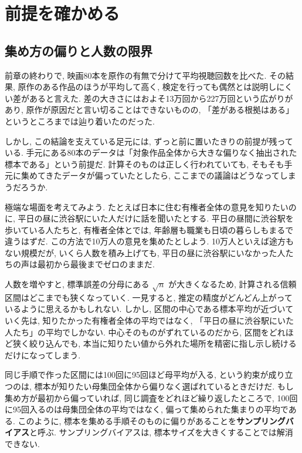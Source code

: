 \section{前提を確かめる}

  \subsection{集め方の偏りと人数の限界}

    前章の終わりで, 映画80本を原作の有無で分けて平均視聴回数を比べた.
    その結果, 原作のある作品のほうが平均して高く, 検定を行っても偶然とは説明しにくい差があると言えた.
    差の大きさにはおよそ13万回から227万回という広がりがあり, 原作が原因だと言い切ることはできないものの, 「差がある根拠はある」というところまでは辿り着いたのだった.

    しかし, この結論を支えている足元には, ずっと前に置いたきりの前提が残っている.
    手元にある80本のデータは「対象作品全体から大きな偏りなく抽出された標本である」という前提だ.
    計算そのものは正しく行われていても, そもそも手元に集めてきたデータが偏っていたとしたら, ここまでの議論はどうなってしまうだろうか.

    極端な場面を考えてみよう.
    たとえば日本に住む有権者全体の意見を知りたいのに, 平日の昼に渋谷駅にいた人だけに話を聞いたとする.
    平日の昼間に渋谷駅を歩いている人たちと, 有権者全体とでは, 年齢層も職業も日頃の暮らしもまるで違うはずだ.
    この方法で10万人の意見を集めたとしよう.
    10万人といえば途方もない規模だが, いくら人数を積み上げても, 平日の昼に渋谷駅にいなかった人たちの声は最初から最後までゼロのままだ.

    人数を増やすと, 標準誤差の分母にある $\sqrt{n}$ が大きくなるため, 計算される信頼区間はどこまでも狭くなっていく.
    一見すると, 推定の精度がどんどん上がっているように思えるかもしれない.
    しかし, 区間の中心である標本平均が近づいていく先は, 知りたかった有権者全体の平均ではなく, 「平日の昼に渋谷駅にいた人たち」の平均でしかない.
    中心そのものがずれているのだから, 区間をどれほど狭く絞り込んでも, 本当に知りたい値から外れた場所を精密に指し示し続けるだけになってしまう.

    同じ手順で作った区間には100回に95回ほど母平均が入る, という約束が成り立つのは, 標本が知りたい母集団全体から偏りなく選ばれているときだけだ.
    もし集め方が最初から偏っていれば, 同じ調査をどれほど繰り返したところで, 100回に95回入るのは母集団全体の平均ではなく, 偏って集められた集まりの平均である.
    このように, 標本を集める手順そのものに偏りがあることを\textbf{サンプリングバイアス}と呼ぶ.
    サンプリングバイアスは, 標本サイズを大きくすることでは解消できない.

